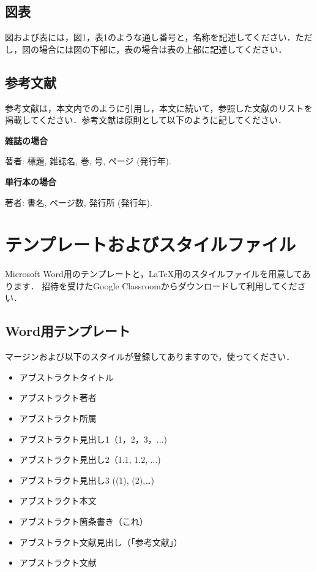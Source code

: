 \documentclass[a4paper,uplatex]{ujarticle}
\begin{document}
\begin{論文概要}
\subsection{図表}
図および表には，図1，表1のような通し番号と，名称を記述してください．ただし，図の場合には図の下部に，表の場合は表の上部に記述してください．

\subsection{参考文献}
参考文献は，本文内で\cite{paper1}\cite{paper2}のように引用し，本文に続いて，参照した文献のリストを掲載してください．参考文献は原則として以下のように記してください．

\begin{newenumerate}

\item {\bf 雑誌の場合}

著者: 標題, 雑誌名, 巻, 号, ページ (発行年).

\item {\bf 単行本の場合}

著者: 書名, ページ数, 発行所 (発行年).

\end{newenumerate}

\section{テンプレートおよびスタイルファイル}
Microsoft Word用のテンプレートと，\LaTeX 用のスタイルファイルを用意してあります．
招待を受けたGoogle Classroomからダウンロードして利用してください．

\subsection{Word用テンプレート}
マージンおよび以下のスタイルが登録してありますので，使ってください．
\begin{itemize}
\item アブストラクトタイトル
\item アブストラクト著者
\item アブストラクト所属
\item アブストラクト見出し1（1，2，3，...)
\item アブストラクト見出し2（1.1, 1.2, ...)
\item アブストラクト見出し3 ((1), (2),…)
\item アブストラクト本文
\item アブストラクト箇条書き（これ）
\item アブストラクト文献見出し（「参考文献」）
\item アブストラクト文献
\end{itemize}


\end{論文概要}
\end{document}
